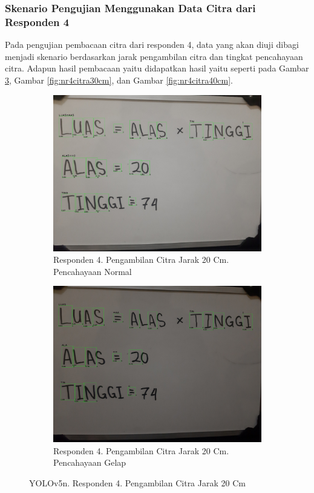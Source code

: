 \subsubsection{Skenario Pengujian Menggunakan Data Citra dari Responden 4}
\label{subsubsec:nskenarioresponden4}

Pada pengujian pembacaan citra dari responden 4, data yang akan diuji dibagi menjadi skenario berdasarkan jarak pengambilan citra dan tingkat pencahayaan citra. Adapun hasil pembacaan yaitu didapatkan hasil yaitu seperti pada Gambar \ref*{fig:nr4citra20cm}, Gambar \ref*{fig:nr4citra30cm}, dan Gambar \ref*{fig:nr4citra40cm}.

\begin{figure}[H]
  \begin{subfigure}{.5\textwidth}
    \centering
    \captionsetup{width=.8\linewidth}
    \includegraphics[width=.8\linewidth]{gambar/yolov5n/responden4/hakimaxt20cm00-result.jpg}
    \caption{Responden 4. Pengambilan Citra Jarak 20 Cm. Pencahayaan Normal}
    \label{fig:nr4tcitra20cm}
  \end{subfigure}%
  \begin{subfigure}{.5\textwidth}
    \centering
    \captionsetup{width=.8\linewidth}
    \includegraphics[width=.8\linewidth]{gambar/yolov5n/responden4/hakimaxt20cm10-result.jpg}
    \caption{Responden 4. Pengambilan Citra Jarak 20 Cm. Pencahayaan Gelap}
    \label{fig:nr4gcitra20cm}
  \end{subfigure}
  \caption{YOLOv5n. Responden 4. Pengambilan Citra Jarak 20 Cm}
  \label{fig:nr4citra20cm}
\end{figure}

